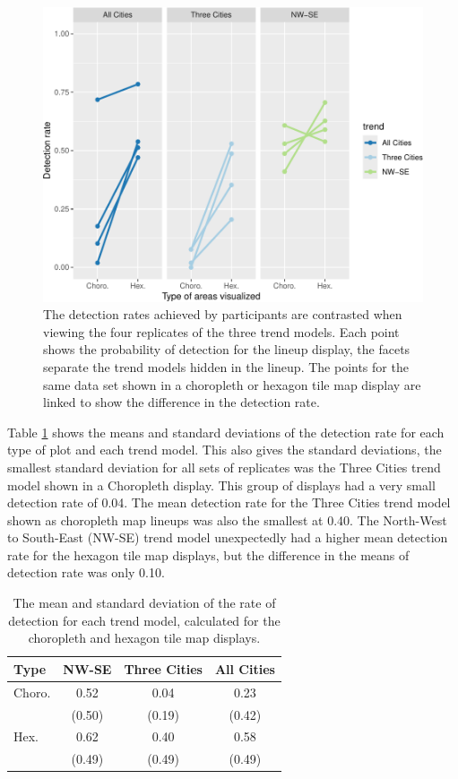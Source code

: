 \documentclass[journal]{vgtc}                     %
\begin{document}
\begin{figure}
\includegraphics[width=1\linewidth]{paper_files/figure-latex/detect-compare-1} \caption{The detection rates achieved by participants are contrasted when viewing the four replicates of the three trend models. Each point shows the probability of detection for the lineup display, the facets separate the trend models hidden in the lineup. The points for the same data set shown in a choropleth or hexagon tile map display are linked to show the difference in the detection rate.}\label{fig:detect-compare}
\end{figure}

Table \ref{tab:desc-stats} shows the means and standard deviations of the detection rate for each type of plot and each trend model. This also gives the standard deviations, the smallest standard deviation for all sets of replicates was the Three Cities trend model shown in a Choropleth display. This group of displays had a very small detection rate of 0.04. The mean detection rate for the Three Cities trend model shown as choropleth map lineups was also the smallest at 0.40.
The North-West to South-East (NW-SE) trend model unexpectedly had a higher mean detection rate for the hexagon tile map displays, but the difference in the means of detection rate was only 0.10.

\begin{table}[h]
\caption{\label{tab:desc-stats}The mean and standard deviation of the rate of detection for each trend model, calculated for the choropleth and hexagon tile map displays.}
\centering
\begin{tabular}[t]{lccc}
\toprule
Type & NW-SE & Three Cities & All Cities\\
\midrule
Choro. & 0.52 & 0.04 & 0.23\\
 & (0.50) & (0.19) & (0.42)\\
\addlinespace
Hex. & 0.62 & 0.40 & 0.58\\
 & (0.49) & (0.49) & (0.49)\\
\bottomrule
\end{tabular}
\end{table}
\end{document}
